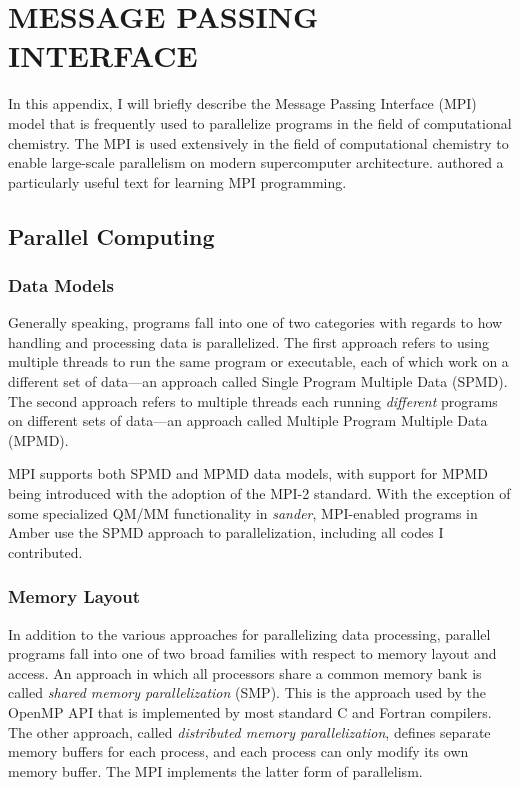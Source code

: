 \chapter{MESSAGE PASSING INTERFACE}
\label{appendixC}

In this appendix, I will briefly describe the Message Passing Interface (MPI)
model that is frequently used to parallelize programs in the field of
computational chemistry. The MPI is used extensively in the field of
computational chemistry to enable large-scale parallelism on modern
supercomputer architecture. \citeauthor{Pachecho1997} authored a particularly
useful text for learning MPI programming. \cite{Pachecho1997}

\section{Parallel Computing}

\subsection{Data Models}

Generally speaking, programs fall into one of two categories with regards to how
handling and processing data is parallelized. The first approach refers to using
multiple threads to run the same program or executable, each of which work on a
different set of data---an approach called Single Program Multiple Data (SPMD).
The second approach refers to multiple threads each running \emph{different}
programs on different sets of data---an approach called Multiple Program
Multiple Data (MPMD).

MPI supports both SPMD and MPMD data models, with support for MPMD being
introduced with the adoption of the MPI-2 standard. With the exception of some
specialized QM/MM functionality in \emph{sander}, MPI-enabled programs in Amber
use the SPMD approach to parallelization, including all codes I contributed.

\subsection{Memory Layout}

In addition to the various approaches for parallelizing data processing,
parallel programs fall into one of two broad families with respect to memory
layout and access. An approach in which all processors share a common memory
bank is called \emph{shared memory parallelization} (SMP). This is the approach
used by the OpenMP API that is implemented by most standard C and Fortran
compilers. The other approach, called \emph{distributed memory parallelization},
defines separate memory buffers for each process, and each process can only
modify its own memory buffer. The MPI implements the latter form of parallelism.


